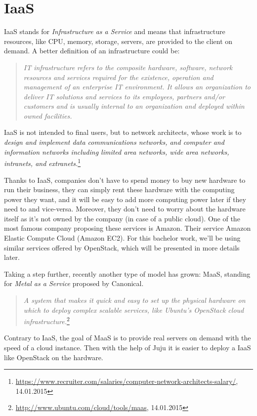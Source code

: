 \section{IaaS}
IaaS stands for \textit{Infrastructure as a Service} and means that infrastructure resources, like CPU, memory, storage, servers, are provided to the client on demand. A better definition of an infrastructure could be:
\begin{quotation}
\textit{
IT infrastructure refers to the composite hardware, software, network resources and services required for the existence, operation and management of an enterprise IT environment. It allows an organization to deliver IT solutions and services to its employees, partners and/or customers and is usually internal to an organization and deployed within owned facilities.
}\cite{cjanssen14}
\end{quotation}

IaaS is not intended to final users, but to network architects, whose work is to 
\textit{design and implement data communications networks, and computer and information networks including limited area networks, wide area networks, intranets, and extranets.}\footnote{\url{https://www.recruiter.com/salaries/computer-network-architects-salary/}, 14.01.2015}

Thanks to IaaS, companies don't have to spend money to buy new hardware to run their business, they can simply rent these hardware with the computing power they want, and it will be easy to add more computing power later if they need to and vice-versa. 
Moreover, they don't need to worry about the hardware itself as it's not owned by the company (in case of a public cloud). 
One of the most famous company proposing these services is Amazon. 
Their service Amazon Elastic Compute Cloud (Amazon EC2). 
For this bachelor work, we'll be using similar services offered by OpenStack, which will be presented in more details later.

Taking a step further, recently another type of model has grown: MaaS, standing for \textit{Metal as a Service} proposed by Canonical. 

\begin{quotation}
\textit{A system that makes it quick and easy to set up the physical hardware on which to deploy complex scalable services, like Ubuntu’s OpenStack cloud infrastructure.}\footnote{\url{http://www.ubuntu.com/cloud/tools/maas}, 14.01.2015}
\end{quotation}

Contrary to IaaS, the goal of MaaS is to provide real servers on demand with the speed of a cloud instance. Then with the help of Juju it is easier to deploy a IaaS like OpenStack on the hardware.






